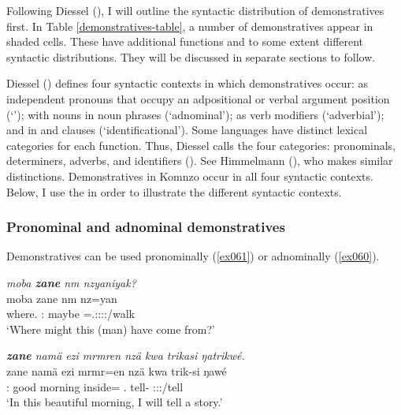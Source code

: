 Following Diessel (\citeyear{Diessel:2009tg}), I will outline the syntactic distribution of demonstratives first. In Table \ref{demonstratives-table}, a number of demonstratives appear in shaded cells. These have additional functions and to some extent different syntactic distributions. They will be discussed in separate sections to follow.%

Diessel (\citeyear{Diessel:2009tg}) defines four syntactic contexts in which demonstratives occur: as independent pronouns that occupy an adpositional or verbal argument position (`'); with nouns in noun phrases (`adnominal'); as verb modifiers (`adverbial'); and in  and  clauses (`identificational'). Some languages have distinct lexical categories for each function. Thus, Diessel calls the four categories:  pronominals,  determiners,  adverbs, and  identifiers (\citeyear[3]{Diessel:2009tg}). See Himmelmann (\citeyear{Himmelmann:1996tp}), who makes similar distinctions. Demonstratives in Komnzo occur in all four syntactic contexts. Below, I use the  in order to illustrate the different syntactic contexts.%

\subsubsection{Pronominal and adnominal demonstratives} \label{demprondet}

Demonstratives can be used pronominally (\ref{ex061}) or adnominally (\ref{ex060}).

\begin{exe}
	\ex \emph{moba \textbf{zane} nm nzyaniyak?}\\
	\gll moba zane nm nz=yan\\
	where.\Abl{} \Dem:\Prox{} maybe \Immpst=\Tsg.\Masc:\Sbj:\Nonpast:\Ipfv:\Venit/walk\\
	\trans `Where might this (man) have come from?' 
	\label{ex061}
\end{exe}
\begin{exe}
	\ex \emph{\textbf{zane} namä ezi mrmren nzä kwa trikasi ŋatrikwé.}\\
	\gll zane namä ezi mrmr=en nzä kwa trik-si ŋawé\\
	\Dem:\Prox{} good morning inside=\Loc{} \Fsg.\Abs{} \Fut{} tell-\Nmlz{} \Fsg:\Sbj:\Nonpast:\Ipfv/tell\\
	\trans `In this beautiful morning, I will tell a story.' 
	\label{ex060}
\end{exe}

